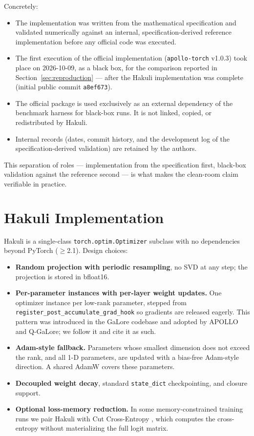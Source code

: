 \documentclass[11pt]{article}
\begin{document}
Concretely:

\begin{itemize}
  \item The implementation was written from the mathematical specification
  and validated numerically against an internal, specification-derived
  reference implementation before any official code was executed.
  \item The first execution of the official implementation
  (\texttt{apollo-torch} v1.0.3) took place on 2026-10-09, as a black box,
  for the comparison reported in Section~\ref{sec:reproduction} --- after the
  Hakuli implementation was complete (initial public commit
  \texttt{a8ef673}).
  \item The official package is used exclusively as an external dependency of
  the benchmark harness for black-box runs. It is not linked, copied, or
  redistributed by Hakuli.
  \item Internal records (dates, commit history, and the development log of
  the specification-derived validation) are retained by the authors.
\end{itemize}

This separation of roles --- implementation from the specification first,
black-box validation against the reference second --- is what makes the
clean-room claim verifiable in practice.

\section{Hakuli Implementation}
\label{sec:implementation}

Hakuli is a single-class \texttt{torch.optim.Optimizer} subclass with no
dependencies beyond PyTorch ($\geq$2.1). Design choices:

\begin{itemize}
  \item \textbf{Random projection with periodic resampling}, no SVD at any
  step; the projection is stored in bfloat16.
  \item \textbf{Per-parameter instances with per-layer weight updates.} One
  optimizer instance per low-rank parameter, stepped from
  \texttt{register\_post\_accumulate\_grad\_hook} so gradients are released
  eagerly. This pattern was introduced in the GaLore codebase and adopted by
  APOLLO and Q-GaLore; we follow it and cite it as such.
  \item \textbf{Adam-style fallback.} Parameters whose smallest dimension does
  not exceed the rank, and all 1-D parameters, are updated with a
  bias-free Adam-style direction. A shared AdamW covers these parameters.
  \item \textbf{Decoupled weight decay}, standard \texttt{state\_dict}
  checkpointing, and closure support.
  \item \textbf{Optional loss-memory reduction.} In some memory-constrained
  training runs we pair Hakuli with Cut Cross-Entropy \citep{wijmans2025cce}, which computes the
  cross-entropy without materializing the full logit matrix.
\end{itemize}
\end{document}
